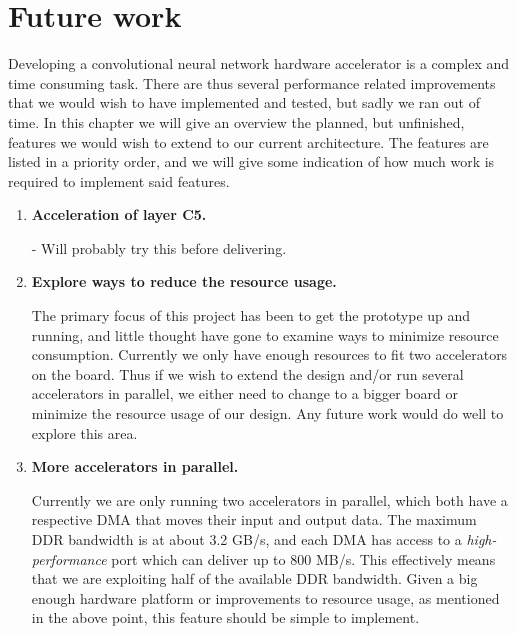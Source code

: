 \chapter{Future work} \label{chap_future_work}

Developing a convolutional neural network hardware accelerator is a complex and time consuming task. There are thus several performance related improvements that we would wish to have implemented and tested, but sadly we ran out of time. In this chapter we will give an overview the planned, but unfinished, features we would wish to extend to our current architecture. The features are listed in a priority order, and we will give some indication of how much work is required to implement said features.


\begin{enumerate}                           


	\item \textbf{Acceleration of layer C5.}
	
-	Will probably try this before delivering. 
	
	\item \textbf{Explore ways to reduce the resource usage.}
	
	The primary focus of this project has been to get the prototype up and running, and little thought have gone to examine ways to minimize resource consumption. Currently we only have enough resources to fit two accelerators on the board. Thus if we wish to extend the design and/or run several accelerators in parallel, we either need to change to a bigger board or minimize the resource usage of our design. Any future work would do well to explore this area. 
	

	
	\item \textbf{More accelerators in parallel.}
	
	Currently we are only running two accelerators in parallel, which both have a respective DMA that moves their input and output data. The maximum DDR bandwidth is at about 3.2 GB/s, and each DMA has access to a \textit{high-performance} port which can  deliver up to 800 MB/s. This effectively means that we are exploiting half of the available DDR bandwidth. Given a big enough hardware platform or improvements to resource usage, as mentioned in the above point, this feature should be simple to implement. 
	

\end{enumerate}
